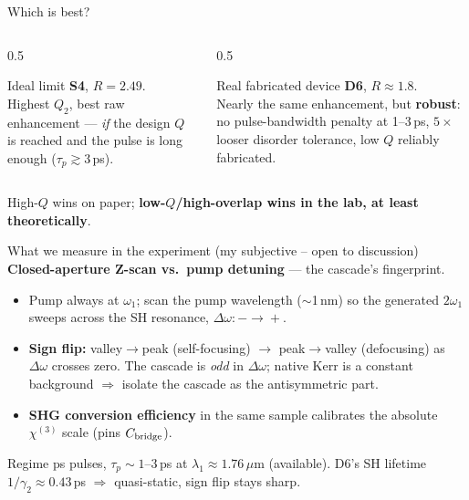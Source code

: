\documentclass[aspectratio=169,11pt]{beamer}
\newcommand{\chithree}{\chi^{(3)}}
\newcommand{\Dom}{\Delta\omega}
\newcommand{\gtwo}{\gamma_2}
\begin{document}
\begin{frame}{Which is best?}
  \begin{columns}[T]
    \begin{column}{0.5\linewidth}
      \begin{block}{Ideal limit}
        \textbf{S4}, $R=2.49$. \\[3pt]
        Highest $Q_2$, best raw enhancement --- \emph{if} the design $Q$ is reached and
        the pulse is long enough ($\tau_p\gtrsim3$\,ps).
      \end{block}
    \end{column}
    \begin{column}{0.5\linewidth}
      \begin{alertblock}{Real fabricated device}
        \textcolor{d6}{\textbf{D6}}, $R\approx1.8$. \\[3pt]
        Nearly the same enhancement, but \textbf{robust}: no pulse-bandwidth penalty at
        1--3\,ps, $5\times$ looser disorder tolerance, low $Q$ reliably fabricated.
      \end{alertblock}
    \end{column}
  \end{columns}
  \vspace{4pt}
  \centering
  \small High-$Q$ wins on paper; \textbf{low-$Q$/high-overlap wins in the lab, at least
  theoretically}.
\end{frame}

\begin{frame}{What we measure in the experiment (my subjective -- open to discussion)}
  \textbf{Closed-aperture Z-scan vs.\ pump detuning} --- the cascade's fingerprint.
  \begin{itemize}\setlength\itemsep{3pt}
    \item Pump always at $\omega_1$; scan the pump wavelength ($\sim$1\,nm) so the generated
          $2\omega_1$ sweeps across the SH resonance, $\Dom:-\!\to\!+$.
    \item \textbf{Sign flip:} valley$\to$peak (self-focusing) $\to$ peak$\to$valley
          (defocusing) as $\Dom$ crosses zero. The cascade is \emph{odd} in $\Dom$;
          native Kerr is a constant background $\Rightarrow$ isolate the cascade as the
          antisymmetric part.
    \item \textbf{SHG conversion efficiency} in the same sample calibrates the absolute
          $\chithree$ scale (pins $C_{\rm bridge}$).
  \end{itemize}
  \begin{block}{Regime}
    ps pulses, $\tau_p\!\sim\!1$--$3$\,ps at $\lambda_1\!\approx\!1.76\,\mu$m (available).
    D6's SH lifetime $1/\gtwo\!\approx\!0.43$\,ps $\Rightarrow$ quasi-static, sign flip
    stays sharp.
  \end{block}
\end{frame}
\end{document}
